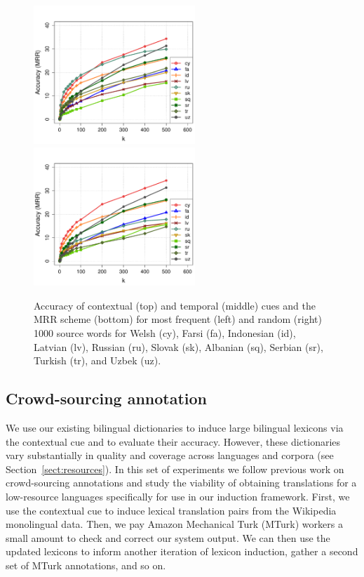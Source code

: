 \documentclass{article}
\newcommand{\secref}[1]{Section~\ref{#1}}
\begin{document}
\begin{figure}[h!]
\centerline{\mbox{\includegraphics[width=2.4in]{figures/exp3/freq/freqmrr} \includegraphics[width=2.4in]{figures/exp3/rand/randmrr}}}
\caption{Accuracy of contextual (top) and temporal (middle) cues and the MRR scheme (bottom) for most frequent (left) and random (right) 1000 source words for Welsh (cy), Farsi (fa), Indonesian (id), Latvian (lv), Russian (ru), Slovak (sk), Albanian (sq), Serbian (sr), Turkish (tr), and Uzbek (uz).}
\label{fig:exp3}
\end{figure}

\subsection{Crowd-sourcing annotation} \label{sect:mturk}

We use our existing bilingual dictionaries to induce large bilingual lexicons via the contextual cue and to evaluate their accuracy.  However, these dictionaries vary substantially in quality and coverage across languages and corpora (see \secref{sect:resources}).  In this set of experiments we follow previous work on crowd-sourcing annotations \cite{Snow:2008,CCB:2009} and study \cite{Irvine:2010} the viability of obtaining translations for a low-resource languages specifically for use in our induction framework.  First, we use the contextual cue to induce lexical translation pairs from the Wikipedia monolingual data. Then, we pay Amazon Mechanical Turk (MTurk) workers a small amount to check and correct our system output. We can then use the updated lexicons to inform another iteration of lexicon induction, gather a second set of MTurk annotations, and so on. \\
\end{document}
